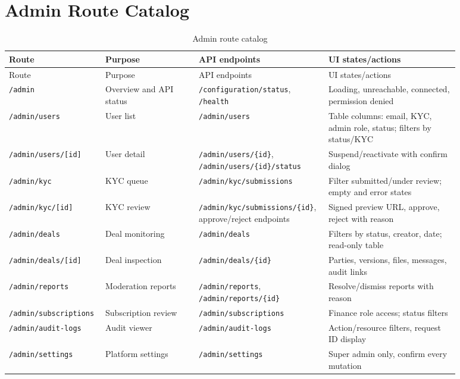 \section*{Admin Route Catalog}
\begin{longtable}{p{0.17\linewidth}p{0.2\linewidth}p{0.23\linewidth}p{0.28\linewidth}}
\caption{Admin route catalog}\\
\toprule
Route & Purpose & API endpoints & UI states/actions \\
\midrule
\endfirsthead
\toprule
Route & Purpose & API endpoints & UI states/actions \\
\midrule
\endhead
\texttt{/admin} & Overview and API status & \texttt{/configuration/status}, \texttt{/health} & Loading, unreachable, connected, permission denied \\
\texttt{/admin/users} & User list & \texttt{/admin/users} & Table columns: email, KYC, admin role, status; filters by status/KYC \\
\texttt{/admin/users/[id]} & User detail & \texttt{/admin/users/\{id\}}, \texttt{/admin/users/\{id\}/status} & Suspend/reactivate with confirm dialog \\
\texttt{/admin/kyc} & KYC queue & \texttt{/admin/kyc/submissions} & Filter submitted/under review; empty and error states \\
\texttt{/admin/kyc/[id]} & KYC review & \texttt{/admin/kyc/submissions/\{id\}}, approve/reject endpoints & Signed preview URL, approve, reject with reason \\
\texttt{/admin/deals} & Deal monitoring & \texttt{/admin/deals} & Filters by status, creator, date; read-only table \\
\texttt{/admin/deals/[id]} & Deal inspection & \texttt{/admin/deals/\{id\}} & Parties, versions, files, messages, audit links \\
\texttt{/admin/reports} & Moderation reports & \texttt{/admin/reports}, \texttt{/admin/reports/\{id\}} & Resolve/dismiss reports with reason \\
\texttt{/admin/subscriptions} & Subscription review & \texttt{/admin/subscriptions} & Finance role access; status filters \\
\texttt{/admin/audit-logs} & Audit viewer & \texttt{/admin/audit-logs} & Action/resource filters, request ID display \\
\texttt{/admin/settings} & Platform settings & \texttt{/admin/settings} & Super admin only, confirm every mutation \\
\bottomrule
\end{longtable}

